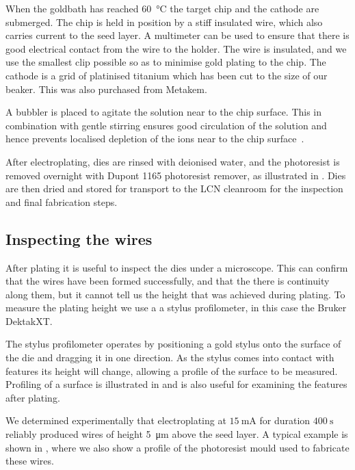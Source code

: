 When the goldbath has reached \SI{60}{\celsius} the target chip and the cathode
are submerged. The chip is held in position by a stiff insulated wire, which
also carries current to the seed layer. A multimeter can be used to ensure that
there is good electrical contact from the wire to the holder. The wire is
insulated, and we use the smallest clip possible so as to minimise gold plating
to the chip.  The cathode is a grid of platinised titanium which has been cut
to the size of our beaker. This was also purchased from Metakem.

A bubbler is placed to agitate the solution near to the chip surface. This in
combination with gentle stirring ensures good circulation of the solution and
hence prevents localised depletion of the ions near to the chip
surface~\cite{Schlesinger2011, SEtienne2020}. 

After electroplating, dies are rinsed with deionised water, and the photoresist
is removed overnight with Dupont 1165 photoresist remover, as illustrated
in . Dies are then
dried and stored for transport to the LCN cleanroom for the inspection and
final fabrication steps.


\subsection{Inspecting the wires}
\label{fab:inspwire}

After plating it is useful to inspect the dies under a microscope. This can
confirm that the wires have been formed successfully, and that the there
is continuity along them, but it cannot tell us the height that was achieved
during plating. To measure the plating height we use a a stylus profilometer,
in this case the Bruker DektakXT.

The stylus profilometer operates by positioning a gold stylus onto the surface of
the die and dragging it in one direction. As the stylus comes into contact with
features its height will change, allowing a profile of the surface to be
measured. Profiling of a surface is illustrated in 
and is also useful for examining the features after plating.

We determined experimentally that electroplating at $\SI{15}{\milli\ampere}$
for duration $\SI{400}{\second}$ reliably produced wires of height
\SI{5}{\micro\meter} above the seed layer. A typical example is shown in
, where we also show a profile of the photoresist
mould used to fabricate these wires.

